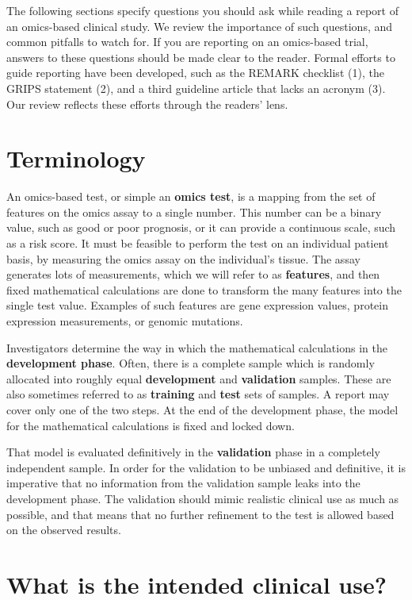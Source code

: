 \documentclass[11pt]{article}
\begin{document}
The following sections specify questions you should ask while reading a
report of an omics-based clinical study. We review the importance of
such questions, and common pitfalls to watch for. If you are reporting
on an omics-based trial, answers to these questions should be made clear
to the reader. Formal efforts to guide reporting have been developed,
such as the REMARK checklist (1), the GRIPS statement (2), and a third
guideline article that lacks an acronym (3). Our review reflects these
efforts through the readers' lens.

\section{Terminology}\label{terminology}

An omics-based test, or simple an \textbf{omics test}, is a mapping from
the set of features on the omics assay to a single number. This number
can be a binary value, such as good or poor prognosis, or it can provide
a continuous scale, such as a risk score. It must be feasible to perform
the test on an individual patient basis, by measuring the omics assay on
the individual's tissue. The assay generates lots of measurements, which
we will refer to as \textbf{features}, and then fixed mathematical
calculations are done to transform the many features into the single
test value. Examples of such features are gene expression values,
protein expression measurements, or genomic mutations.

Investigators determine the way in which the mathematical calculations
in the \textbf{development phase}. Often, there is a complete sample
which is randomly allocated into roughly equal \textbf{development} and
\textbf{validation} samples. These are also sometimes referred to as
\textbf{training} and \textbf{test} sets of samples. A report may cover
only one of the two steps. At the end of the development phase, the
model for the mathematical calculations is fixed and locked down.

That model is evaluated definitively in the \textbf{validation} phase in
a completely independent sample. In order for the validation to be
unbiased and definitive, it is imperative that no information from the
validation sample leaks into the development phase. The validation
should mimic realistic clinical use as much as possible, and that means
that no further refinement to the test is allowed based on the observed
results.

\section{What is the intended clinical
use?}\label{what-is-the-intended-clinical-use}
\end{document}
